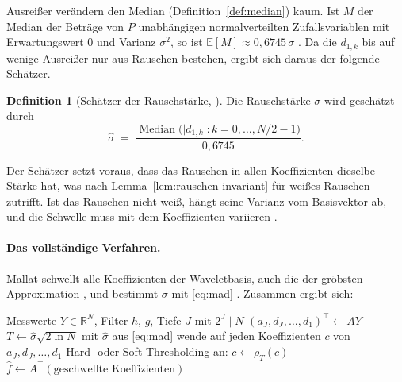 \documentclass[a4paper,11pt,bibliography=totoc,listof=totoc,headinclude=true,cleardoublepage=empty,oneside]{scrbook}
\theoremstyle{plain}
\theoremstyle{definition}
\newtheorem{Definition}[Satz]{Definition}
\newcommand{\R}{\mathbb{R}}
\begin{document}
Ausrei\ss er verändern den Median (Definition~\ref{def:median}) kaum. Ist $M$
der Median der Beträge von $P$ unabhängigen normalverteilten Zufallsvariablen
mit Erwartungswert $0$ und Varianz $\sigma^2$, so ist
$\mathbb E[M]\approx0{,}6745\,\sigma$ \cite[Kap.~11.3.1]{mallat}. %
Da die $d_{1,k}$ bis auf wenige Ausrei\ss er nur aus Rauschen bestehen, ergibt
sich daraus der folgende Schätzer.

\begin{Definition}[Schätzer der Rauschstärke, {\cite[Gl.~(11.85)]{mallat}}] %
\label{def:mad}
Die Rauschstärke $\sigma$ wird geschätzt durch
\begin{equation}
\label{eq:mad}
  \hat\sigma \;=\; \frac{\operatorname{Median}\bigl(\lvert d_{1,k}\rvert : k = 0,\dots,N/2-1\bigr)}{0{,}6745} .
\end{equation}
\end{Definition}

Der Schätzer setzt voraus, dass das Rauschen in allen Koeffizienten dieselbe
Stärke hat, was nach Lemma~\ref{lem:rauschen-invariant} für wei\ss es Rauschen
zutrifft. Ist das Rauschen nicht wei\ss, hängt seine Varianz vom Basisvektor
ab, und die Schwelle muss mit dem Koeffizienten variieren
\cite[Kap.~11.2.2]{mallat}. %
 
\paragraph{Das vollständige Verfahren.}
Mallat schwellt alle Koeffizienten der Waveletbasis, auch die der gröbsten
Approximation \cite[Gl.~(11.84)]{mallat}, %
und bestimmt $\sigma$ mit \eqref{eq:mad} \cite[Kap.~11.3.1]{mallat}. %
Zusammen ergibt sich:
 
\begin{algorithm}[H]
\caption[Entrauschen mit universeller Schwelle]{Entrauschen mit universeller
Schwelle nach \cite[Kap.~11.2--11.3]{mallat}}
\label{alg:visushrink}
\begin{algorithmic}[1]
\Require Messwerte $Y\in\R^N$, Filter $h$, $g$, Tiefe $J$ mit $2^{J}\mid N$
\State $(a_J,d_J,\dots,d_1)^\top \gets AY$ 
\State $T \gets \hat\sigma\sqrt{2\ln N}$ mit $\hat\sigma$ aus \eqref{eq:mad}
\State wende auf jeden Koeffizienten $c$ von $a_J,d_J,\dots,d_1$ Hard- oder
  Soft-Thresholding an: $c \gets \rho_T(c)$ 
\State \Return $\hat f \gets A^\top(\text{geschwellte Koeffizienten})$ 
\end{algorithmic}
\end{algorithm}
 
\end{document}
